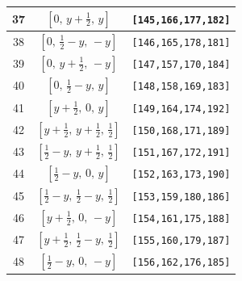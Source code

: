 \documentclass[fleqn,8pt]{jsarticle}
\begin{document}
\begin{longtable}{ccc}
37 & $\left[ 0,\, y + \frac{1}{2},\, y \right]$ & {\tt [145,166,177,182]} \\ \hline
38 & $\left[ 0,\, \frac{1}{2} - y,\, - y \right]$ & {\tt [146,165,178,181]} \\ \hline
39 & $\left[ 0,\, y + \frac{1}{2},\, - y \right]$ & {\tt [147,157,170,184]} \\ \hline
40 & $\left[ 0,\, \frac{1}{2} - y,\, y \right]$ & {\tt [148,158,169,183]} \\ \hline
41 & $\left[ y + \frac{1}{2},\, 0,\, y \right]$ & {\tt [149,164,174,192]} \\ \hline
42 & $\left[ y + \frac{1}{2},\, y + \frac{1}{2},\, \frac{1}{2} \right]$ & {\tt [150,168,171,189]} \\ \hline
43 & $\left[ \frac{1}{2} - y,\, y + \frac{1}{2},\, \frac{1}{2} \right]$ & {\tt [151,167,172,191]} \\ \hline
44 & $\left[ \frac{1}{2} - y,\, 0,\, y \right]$ & {\tt [152,163,173,190]} \\ \hline
45 & $\left[ \frac{1}{2} - y,\, \frac{1}{2} - y,\, \frac{1}{2} \right]$ & {\tt [153,159,180,186]} \\ \hline
46 & $\left[ y + \frac{1}{2},\, 0,\, - y \right]$ & {\tt [154,161,175,188]} \\ \hline
47 & $\left[ y + \frac{1}{2},\, \frac{1}{2} - y,\, \frac{1}{2} \right]$ & {\tt [155,160,179,187]} \\ \hline
48 & $\left[ \frac{1}{2} - y,\, 0,\, - y \right]$ & {\tt [156,162,176,185]} \\
\end{longtable}
\renewcommand{\arraystretch}{1.2}
\end{document}
